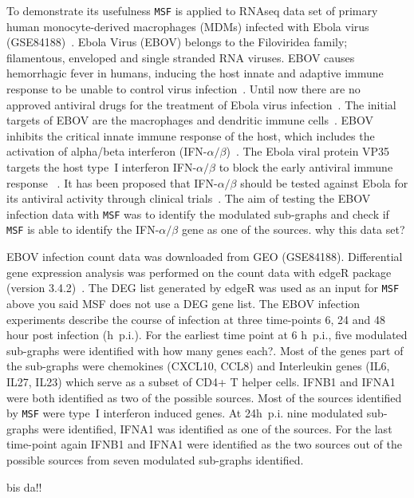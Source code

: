 \documentclass[10pt,a4paper,twocolumn]{article}
\newcommand{\TODO}[1]{\begingroup\color{red}#1\endgroup}
\begin{document}
To demonstrate its usefulness \texttt{MSF} is applied to RNAseq data
set of primary human monocyte-derived macrophages (MDMs) infected with
Ebola virus (GSE84188)~\cite{Olejnik}. Ebola Virus (EBOV) belongs to
the Filoviridea family; filamentous, enveloped and single stranded RNA
viruses. EBOV causes hemorrhagic fever in humans, inducing the host
innate and adaptive immune response to be unable to control virus
infection~\cite{Prins}. Until now there are no approved antiviral
drugs for the treatment of Ebola virus infection~\cite{Konde,Rhein}.
The initial targets of EBOV are the macrophages and dendritic immune
cells~\cite{Falasca,Rhein}. EBOV inhibits the critical innate immune
response of the host, which includes the activation of alpha/beta
interferon (IFN-$\alpha / \beta$)~\cite{Prins,Konde,Cardenas}. The
Ebola viral protein VP35 targets the host type~I interferon
IFN-$\alpha / \beta$ to block the early antiviral immune response
~\cite{Prins,Konde,Falasca,Cardenas,Olejnik}. It has been proposed
that IFN-$\alpha / \beta$ should be tested against Ebola for its
antiviral activity through clinical trials~\cite{Konde}. The aim of
testing the EBOV infection data with \texttt{MSF} was to identify the
modulated sub-graphs and check if \texttt{MSF} is able to identify the
IFN-$\alpha / \beta$ gene as one of the sources. \TODO{why this data set?}

EBOV infection count data was downloaded from GEO
(GSE84188). Differential gene expression analysis was performed on the
count data with edgeR package (version 3.4.2)~\cite{edgeR}. The DEG
list generated by edgeR was used as an input for \texttt{MSF} \TODO{above you said MSF does not use a DEG gene list}. The
EBOV infection experiments describe the course of infection at three time-points 6, 24 and 48 hour post
infection (h~p.i.). For the earliest time point at 6 h~p.i., five modulated sub-graphs were
identified \TODO{with how many genes each?}. Most of the genes part of the sub-graphs were chemokines
(CXCL10, CCL8) and Interleukin genes (IL6, IL27, IL23) which serve as
a subset of CD4+ T helper cells. IFNB1 and IFNA1 were both identified
as two of the possible sources. Most of the sources identified by
\texttt{MSF} were type~I interferon induced genes. At 24h~p.i. nine
modulated sub-graphs were identified, IFNA1 was identified as one of
the sources. For the last time-point again IFNB1 and IFNA1 were
identified as the two sources out of the possible sources from seven
modulated sub-graphs identified.

\TODO{bis da!!}
\end{document}
